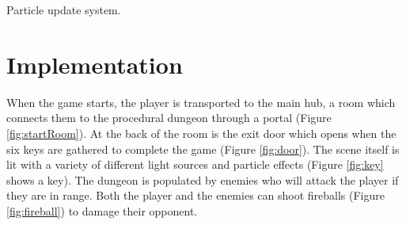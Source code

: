\documentclass[a4paper, oneside, 11pt]{report}
\begin{document}
\begin{algorithm}[H]
    \begin{algorithmic}[1]
        \ENDWHILE
            \ELSE
            \ENDIF
        \ENDFOR
    \end{algorithmic}
\caption{Particle update system.}\label{particle-update}
\end{algorithm}

\chapter{Implementation}
When the game starts, the player is transported to the main hub, a room which connects them to the procedural dungeon through a portal (Figure \ref{fig:startRoom}). At the back of the room is the exit door which opens when the six keys are gathered to complete the game (Figure \ref{fig:door}). The scene itself is lit with a variety of different light sources and particle effects (Figure \ref{fig:key} shows a key). The dungeon is populated by enemies who will attack the player if they are in range. Both the player and the enemies can shoot fireballs (Figure \ref{fig:fireball}) to damage their opponent.
\end{document}
